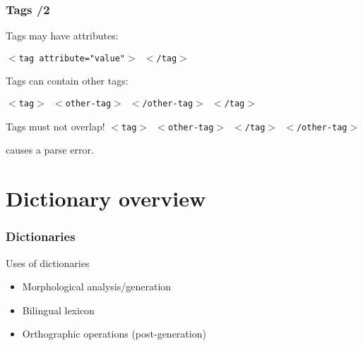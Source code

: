\documentclass{beamer} %
\begin{document}
\begin{frame}
  \frametitle{Tags /2}
  Tags may have attributes: 

  {\tt $<$tag attribute="value"$>$ $<$/tag$>$}

  Tags can contain other tags: 

  {\tt $<$tag$>$ $<$other-tag$>$ $<$/other-tag$>$ $<$/tag$>$}

  \begin{alertblock}{Tags must not overlap!}
    {\tt $<$tag$>$ $<$other-tag$>$ $<$/tag$>$ $<$/other-tag$>$}

   causes a parse error. 
  \end{alertblock}
\end{frame}

\section{Dictionary overview}

\begin{frame}
  \frametitle{Dictionaries}
  
  \begin{block}{Uses of dictionaries}
    \begin{itemize}
    \item Morphological analysis/generation
    \item Bilingual lexicon
    \item Orthographic operations (post-generation)
    \end{itemize}
  \end{block}

\end{frame}
\end{document}
